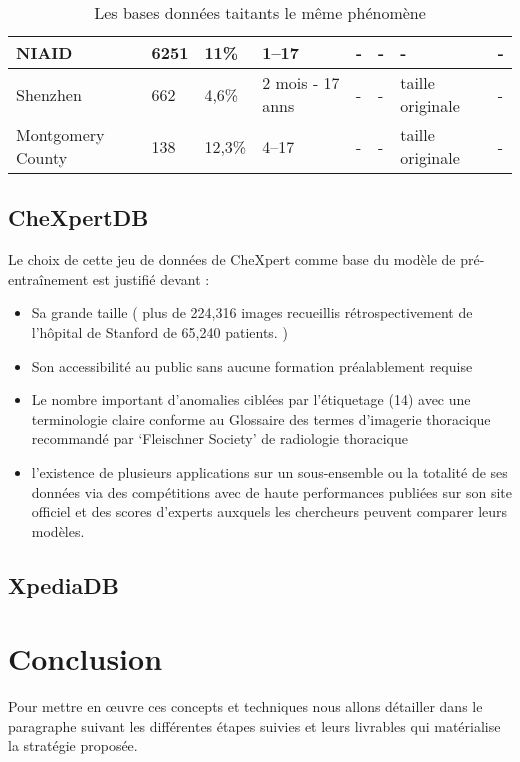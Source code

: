 \begin{table}[H]
\begin{tabularx}{\textwidth}{ |X|X|X|X|X|X|X|X| }
            \hline
            \hfil NIAID & \hfil 6251 & \hfil 11\% & \hfil 1–17 & \hfil - & \hfil - & \hfil - & \hfil - \\
            \hline
            \hfil Shenzhen & \hfil 662 & \hfil 4,6\% & \hfil 2 mois - 17 anns & \hfil - & \hfil - & \hfil taille originale & \hfil - \\
            \hline
            \hfil Montgomery County & \hfil 138 & \hfil 12,3\% &  \hfil 4–17 & \hfil - & \hfil - & \hfil taille originale & \hfil - \\
            \hline
        \end{tabularx}
        \caption{Les bases données taitants le même phénomène}\label{table:all_dbs}
    \end{table}
    \subsection{CheXpertDB}\label{chexpertDB}
    Le choix de cette  jeu de données de CheXpert comme base du modèle de pré-entraînement est justifié devant :
    \begin{itemize}[label=$\bullet$]
        \item Sa grande taille  ( plus de 224,316  images recueillis rétrospectivement de l'hôpital de Stanford de 65,240 patients. ) 
        \item Son accessibilité au public sans aucune formation préalablement requise
        \item Le nombre important d’anomalies ciblées par l'étiquetage (14) avec une terminologie claire conforme au Glossaire des termes d'imagerie thoracique recommandé par ‘Fleischner Society’ de radiologie thoracique 
        \item l’existence de plusieurs applications sur un sous-ensemble ou  la totalité de ses données via des compétitions avec de haute performances publiées sur son site officiel et des scores d'experts auxquels les chercheurs peuvent comparer leurs modèles.
        

    \end{itemize}
    \subsection{XpediaDB}

\section*{Conclusion}
Pour mettre en œuvre ces concepts et techniques nous allons détailler dans le paragraphe suivant les différentes étapes suivies et leurs livrables qui matérialise la stratégie proposée.